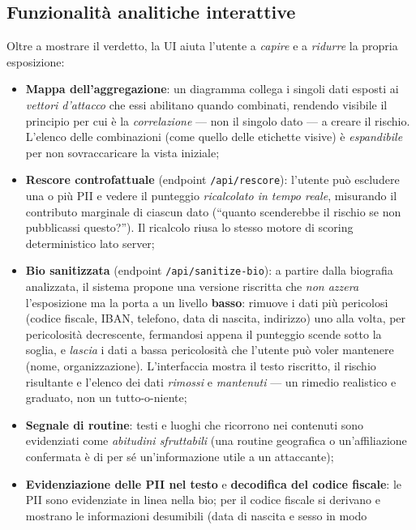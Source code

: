 \documentclass[11pt,a4paper]{article}
\begin{document}
\subsection{Funzionalità analitiche interattive}
 Oltre a mostrare il verdetto, la UI aiuta
l'utente a \emph{capire} e a \emph{ridurre} la propria esposizione:
\begin{itemize}[nosep]
  \item \textbf{Mappa dell'aggregazione}: un diagramma collega i singoli dati esposti ai
        \emph{vettori d'attacco} che essi abilitano quando combinati, rendendo visibile il
        principio per cui è la \emph{correlazione} — non il singolo dato — a creare il
        rischio. L'elenco delle combinazioni (come quello delle etichette visive) è
        \emph{espandibile} per non sovraccaricare la vista iniziale;
  \item \textbf{Rescore controfattuale} (endpoint \texttt{/api/rescore}): l'utente può
        escludere una o più PII e vedere il punteggio \emph{ricalcolato in tempo reale},
        misurando il contributo marginale di ciascun dato (``quanto scenderebbe il rischio
        se non pubblicassi questo?''). Il ricalcolo riusa lo stesso motore di scoring
        deterministico lato server;
  \item \textbf{Bio sanitizzata} (endpoint \texttt{/api/sanitize-bio}): a partire dalla
        biografia analizzata, il sistema propone una versione riscritta che \emph{non azzera}
        l'esposizione ma la porta a un livello \textbf{basso}: rimuove i dati più pericolosi
        (codice fiscale, IBAN, telefono, data di nascita, indirizzo) uno alla volta, per
        pericolosità decrescente, fermandosi appena il punteggio scende sotto la soglia, e
        \emph{lascia} i dati a bassa pericolosità che l'utente può voler mantenere (nome,
        organizzazione). L'interfaccia mostra il testo riscritto, il rischio risultante e
        l'elenco dei dati \emph{rimossi} e \emph{mantenuti} --- un rimedio realistico e
        graduato, non un tutto-o-niente;
  \item \textbf{Segnale di routine}: testi e luoghi che ricorrono nei contenuti sono
        evidenziati come \emph{abitudini sfruttabili} (una routine geografica o
        un'affiliazione confermata è di per sé un'informazione utile a un attaccante);
  \item \textbf{Evidenziazione delle PII nel testo} e \textbf{decodifica del codice
        fiscale}: le PII sono evidenziate in linea nella bio; per il codice fiscale si
        derivano e mostrano le informazioni desumibili (data di nascita e sesso in modo

\end{itemize}
\end{document}
